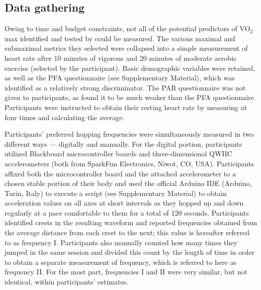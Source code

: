 \documentclass{article}
\begin{document}
\subsection{Data gathering}
Owing to time and budget constraints, not all of the potential predictors of VO$_2$max identified and tested by \textcite{abut2016} could be measured. The various maximal and submaximal metrics they selected were collapsed into a simple measurement of heart rate after 10 minutes of vigorous and 20 minutes of moderate aerobic exercise (selected by the participant). Basic demographic variables were retained, as well as the PFA questionnaire (see Supplementary Material), which was identified as a relatively strong discriminator. The PAR questionnaire was not given to participants, as \textcite{abut2016} found it to be much weaker than the PFA questionnaire. Participants were instructed to obtain their resting heart rate by measuring at four times and calculating the average.

Participants' preferred hopping frequencies were simultaneously measured in two different ways — digitally and manually. For the digital portion, participants utilized Blackboard microcontroller boards and three-dimensional QWIIC accelerometers (both from SparkFun Electronics, Niwot, CO, USA). Participants affixed both the microcontroller board and the attached accelerometer to a chosen stable portion of their body and used the official Arduino IDE (Arduino, Turin, Italy) to execute a script (see Supplementary Material) to obtain acceleration values on all axes at short intervals as they hopped up and down regularly at a pace comfortable to them for a total of 120 seconds. Participants identified crests in the resulting waveform and reported frequencies obtained from the average distance from each crest to the next; this value is hereafter referred to as frequency I. Participants also manually counted how many times they jumped in the same session and divided this count by the length of time in order to obtain a separate measurement of frequency, which is referred to here as frequency II. For the most part, frequencies I and II were very similar, but not identical, within participants' estimates.
\end{document}
